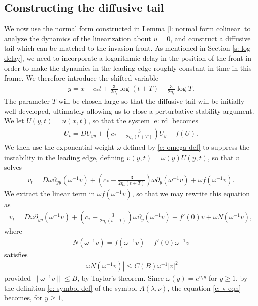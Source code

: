 \documentclass[11pt]{article}
\numberwithin{equation}{section}
\numberwithin{prop}{section}
\begin{document}
\subsection{Constructing the diffusive tail}\label{s: colinear diffusive tail}
We now use the normal form constructed in Lemma \ref{l: normal form colinear} to analyze the dynamics of the linearization about $u = 0$, and construct a diffusive tail which can be matched to the invasion front. As mentioned in Section \ref{s: log delay}, we need to incorporate a logarithmic delay in the position of the front in order to make the dynamics in the leading edge roughly constant in time in this frame. We therefore introduce the shifted variable
\begin{align}
y = x - c_*t + \frac{3}{2 \eta_*} \log (t+T) - \frac{3}{2 \eta_*} \log T. \label{e: y def}
\end{align}
The parameter $T$ will be chosen large so that the diffusive tail will be initially well-developed, ultimately allowing us to close a perturbative stability argument. We let $U(y,t) = u(x,t)$, so that the system \eqref{e: rd} becomes 
\begin{align}
U_t = D U_{yy} + \left(c_* - \frac{3}{2 \eta_* (t+T)} \right) U_y + f(U). \label{e: U eqn}
\end{align}
We then use the exponential weight $\omega$ defined by \eqref{e: omega def} to suppress the instability in the leading edge, defining $v(y,t) = \omega(y) U(y,t)$, so that $v$ solves 
\begin{align}
v_t = D \omega \partial_{yy} (\omega^{-1} v) + \left(c_* - \frac{3}{2 \eta_* (t+T)} \right) \omega \partial_y (\omega^{-1} v) + \omega f(\omega^{-1} v). 
\end{align}
We extract the linear term in $\omega f(\omega^{-1} v)$, so that we may rewrite this equation as 
\begin{align}
v_t = D \omega \partial_{yy} (\omega^{-1} v) + \left(c_* - \frac{3}{2 \eta_* (t+T)} \right) \omega \partial_y (\omega^{-1} v) + f'(0) v + \omega N(\omega^{-1} v), \label{e: v eqn}
\end{align}
where
\begin{align}
N(\omega^{-1} v) = f(\omega^{-1} v) - f'(0) \omega^{-1} v
\end{align}
satisfies
\begin{align}
| \omega N(\omega^{-1} v)| \leq C(B) \omega^{-1} |v|^2 
\end{align}
provided $\| \omega^{-1} v \| \leq B$, by Taylor's theorem. Since $\omega(y) = e^{\eta_*y}$ for $y \geq 1$, by the definition \eqref{e: symbol def} of the symbol $A(\lambda, \nu)$, the equation \eqref{e: v eqn} becomes, for $y \geq 1$,
\end{document}

